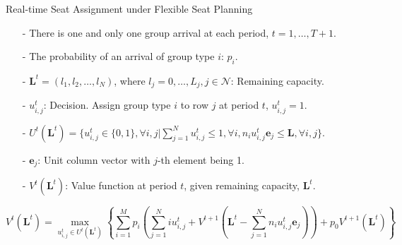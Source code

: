   \begin{frame}{Real-time Seat Assignment under Flexible Seat Planning}
    \centering
    \small
    \begin{itemize}
    \item[-] There is one and only one group arrival at each period, $t = 1, \ldots, T+1$. 
    \item[-] The probability of an arrival of group type $i$: $p_i$.
    \item[-] $\mathbf{L}^{t} = (l_1, l_2, \ldots, l_{N})$, where $l_j =0,\ldots, L_j, j\in \mathcal{N}$: Remaining capacity.
    \item[-] $u_{i,j}^{t}$: Decision. Assign group type $i$ to row $j$ at period $t$, $u_{i,j}^t =1$.
    \item[-] $U^{t}(\mathbf{L}^{t}) = \{u_{i,j}^{t} \in\{0,1\}, \forall i,j| \sum_{j=1}^{N} u_{i,j}^{t} \leq 1, \forall i, n_{i}u_{i,j}^{t}\mathbf{e}_j \leq \mathbf{L}, \forall i,j \}$.
    \item[-] $\mathbf{e}_j$: Unit column vector with $j$-th element being 1.
    \item[-] $V^{t}(\mathbf{L}^{t})$: Value function at period $t$, given remaining capacity, $\mathbf{L}^{t}$.
    \end{itemize}

    $$V^{t}(\mathbf{L}^{t}) = \max_{u_{i,j}^{t} \in U^{t}(\mathbf{L}^{t})}\left\{ \sum_{i=1}^{M} p_i ( \sum_{j=1}^{N} i u_{i,j}^{t} + V^{t+1}(\mathbf{L}^{t}- \sum_{j=1}^{N} n_i u_{i,j}^{t}\mathbf{e}_j)) + p_0 V^{t+1}(\mathbf{L}^{t})\right\}$$
    \small
\end{frame}

